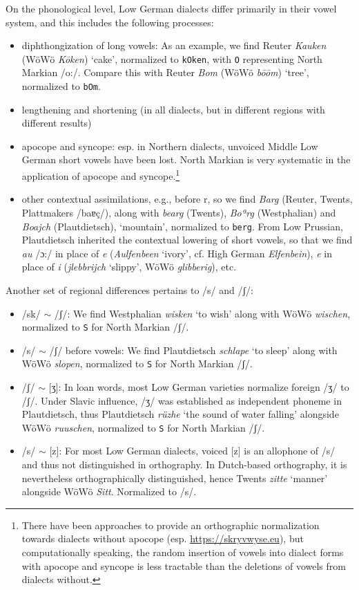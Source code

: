 \documentclass[11pt]{article}
\newcommand{\word}[1]{\textsl{#1}} %
\newcommand{\code}[1]{\texttt{#1}} %
\begin{document}
\begin{enumerate}
On the phonological level, Low German dialects differ primarily in their vowel system, and this includes the following processes:

\begin{itemize}
\item diphthongization of long vowels: As an example, we find Reuter \word{Kauken} (WöWö \word{Kōken}) `cake', normalized to \code{kOken}, with \code{O} representing North Markian /o:/. Compare this with Reuter \word{Bom} (WöWö \word{bōōm}) `tree', normalized to \code{bOm}.
\item lengthening and shortening (in all dialects, but in different regions with different results)
\item apocope and syncope: esp. in Northern dialects, unvoiced Middle Low German short vowels have been lost. North Markian is very systematic in the application of apocope and syncope.\footnote{
    There have been approaches to provide an orthographic normalization towards dialects without apocope (esp. \url{https://skryvwyse.eu}), but computationally speaking, the random insertion of vowels into dialect forms with apocope and syncope is less tractable than the deletions of vowels from dialects without.
}
\item other contextual assimilations, e.g., before r, so we find \word{Barg} (Reuter, Twents, Plattmakers 
/baɐç/), 
along with \word{bearg} (Twents), \word{Boªrg} (Westphalian) and \word{Boajch} (Plautdietsch),  `mountain', normalized to \code{berg}. From Low Prussian, Plautdietsch inherited the contextual lowering of short vowels, so that we find \word{au} /ɔ:/ in place of \word{e} (\word{Aulfenbeen} `ivory', cf. High German \word{Elfenbein}), \word{e} in place of \word{i} (\word{jlebbrijch} `slippy', WöWö \word{glibberig}), etc.
\end{itemize}

Another set of regional differences pertains to /s/ and /ʃ/:

\begin{itemize}
    \item /sk/ $\sim$ /ʃ/: We find Westphalian \word{wisken} `to wish' along with WöWö \word{wischen}, normalized to \code{S} for North Markian /ʃ/.
    \item /s/ $\sim$ /ʃ/ before vowels: We find Plautdietsch \word{schlape} `to sleep' along with WöWö \word{slopen}, normalized to \code{S} for North Markian /ʃ/.
    \item /ʃ/ $\sim$ [ʒ]: In loan words, most Low German varieties normalize foreign /ʒ/ to /ʃ/. Under Slavic influence, /ʒ/ was established as independent phoneme in Plautdietsch, thus Plautdietsch \word{rüzhe} `the sound of water falling' alongside WöWö \word{ruuschen}, normalized to \code{S} for North Markian /ʃ/.
    \item /s/ $\sim$ [z]: For most Low German dialects, voiced [z] is an allophone of /s/ and thus not distinguished in orthography. In Dutch-based orthography, it is nevertheless orthographically distinguished, hence Twents \word{zitte} `manner' alongside WöWö \word{Sitt}. Normalized to /s/.
\end{itemize}


\end{enumerate}
\end{document}
